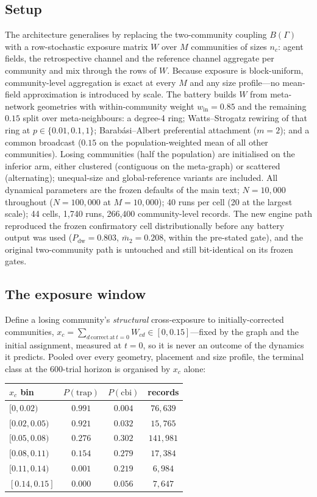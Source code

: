 \documentclass[11pt]{article}
\newcommand{\1}{\mathbf{1}}
\begin{document}
\subsection{Setup}
The architecture generalises by replacing the two-community coupling $B(\Gamma)$ with a row-stochastic exposure matrix $W$ over $M$ communities of sizes $n_c$: agent fields, the retrospective channel and the reference channel aggregate per community and mix through the rows of $W$. Because exposure is block-uniform, community-level aggregation is exact at every $M$ and any size profile---no mean-field approximation is introduced by scale. The battery builds $W$ from meta-network geometries with within-community weight $w_{\mathrm{in}}=0.85$ and the remaining $0.15$ split over meta-neighbours: a degree-4 ring; Watts--Strogatz rewiring of that ring at $p\in\{0.01,0.1,1\}$; Barab\'asi--Albert preferential attachment ($m=2$); and a common broadcast ($0.15$ on the population-weighted mean of all other communities). Losing communities (half the population) are initialised on the inferior arm, either clustered (contiguous on the meta-graph) or scattered (alternating); unequal-size and global-reference variants are included. All dynamical parameters are the frozen defaults of the main text; $N=10{,}000$ throughout ($N=100{,}000$ at $M=10{,}000$); 40 runs per cell (20 at the largest scale); 44 cells, 1,740 runs, 266,400 community-level records. The new engine path reproduced the frozen confirmatory cell distributionally before any battery output was used ($P_{\mathrm{dw}}=0.803$, $\bar m_2=0.208$, within the pre-stated gate), and the original two-community path is untouched and still bit-identical on its frozen gates.

\subsection{The exposure window}
Define a losing community's \emph{structural} cross-exposure to initially-corrected communities, $x_c=\sum_{d\,\mathrm{correct\,at}\,t=0}W_{cd}\in[0,0.15]$---fixed by the graph and the initial assignment, measured at $t=0$, so it is never an outcome of the dynamics it predicts. Pooled over every geometry, placement and size profile, the terminal class at the 600-trial horizon is organised by $x_c$ alone:

\begin{center}
\begin{tabular}{lccc}
\hline
$x_c$ bin & $P(\mathrm{trap})$ & $P(\mathrm{cbi})$ & records \\
\hline
$[0,0.02)$ & $0.991$ & $0.004$ & $76{,}639$ \\
$[0.02,0.05)$ & $0.921$ & $0.032$ & $15{,}765$ \\
$[0.05,0.08)$ & $0.276$ & $0.302$ & $141{,}981$ \\
$[0.08,0.11)$ & $0.154$ & $0.279$ & $17{,}384$ \\
$[0.11,0.14)$ & $0.001$ & $0.219$ & $6{,}984$ \\
$[0.14,0.15]$ & $0.000$ & $0.056$ & $7{,}647$ \\
\hline
\end{tabular}
\end{center}
\end{document}

